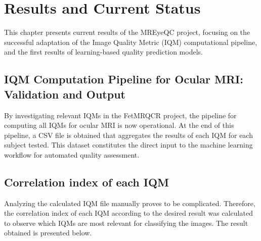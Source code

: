 
\chapter{Results and Current Status}
\label{chap:results}


This chapter presents current results of the MREyeQC project, focusing on the successful adaptation of the Image Quality Metric (IQM) computational pipeline, and the first results of learning-based quality prediction models.

\section{IQM Computation Pipeline for Ocular MRI: Validation and Output}
\label{sec:iqm_pipeline_validation}
By investigating relevant IQMs in the FetMRQCR project, the pipeline for computing all IQMs for ocular MRI is now operational. At the end of this pipeline, a CSV file is obtained that aggregates the results of each IQM for each subject tested. This dataset constitutes the direct input to the machine learning workflow for automated quality assessment.

\section{Correlation index of each IQM}
Analyzing the calculated IQM file manually proves to be complicated. Therefore, the correlation index of each IQM according to the desired result was calculated to observe which IQMs are most relevant for classifying the images. The result obtained is presented below.

